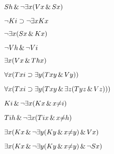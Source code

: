\begin{earg}
\item $Sh \,\&\, \neg \exists x (Vx \,\&\, Sx)$%
\item $\neg Ki \supset \neg\exists x Kx$%
\item $\neg \exists x (Sx \,\&\, Kx)$%
\item $\neg Vh \,\&\, \neg Vi$%
\item $\exists x (Vx \,\&\, Thx)$%
\item $\forall x (Txi \supset \exists y (Txy \,\&\, Vy))$%
\item $\forall x (Txi \supset \exists y (Txy \,\&\, \exists z (Tyz \,\&\, Vz)))$%
\item $Ki \,\&\, \neg \exists x (Kx \,\&\, x{\neq}i)$%
\item $Tih \,\&\, \neg \exists x (Tix \,\&\, x{\neq}h)$%
\item $\exists x (Kx \,\&\, \neg \exists y (Ky \,\&\, x{\neq}y) \,\&\, Vx)$%
\item $\exists x (Kx \,\&\, \neg \exists y (Ky \,\&\, x{\neq}y) \,\&\, \neg Sx)$ %
\end{earg}



